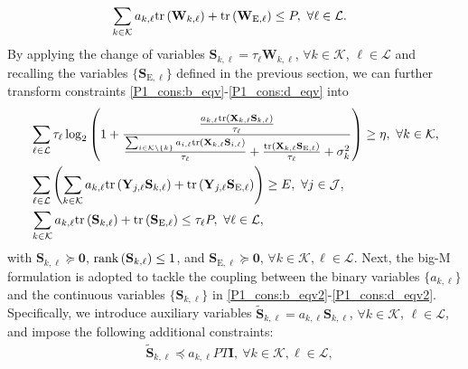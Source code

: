 \documentclass[12pt,draftclsnofoot, onecolumn]{IEEEtran}
\theoremstyle{plain}
\begin{document}
\begin{sloppypar}
{\begin{align}
&  \sum_{k\in\mathcal K}a_{k,\ell}{\rm tr}\left( \mathbf W_{k,\ell}\right)  + {\rm tr}\left(\mathbf W_{\mathrm E,\ell} \right) \leq P, \ \forall \ell\in\mathcal L. \label{P1_cons:d_eqv}
\end{align}}%
By applying the change of variables $\mathbf S_{k,\ell} = \tau_\ell\mathbf W_{k,\ell}$, $\forall k\in\mathcal K$, $\ell\in\mathcal L$ and recalling the variables $\{\mathbf S_{\mathrm E, \ell}\}$ defined in the previous section, we can further transform constraints \eqref{P1_cons:b_eqv}-\eqref{P1_cons:d_eqv} into 
{\setlength\abovedisplayskip{7pt}
\setlength\belowdisplayskip{6pt}  
\begin{align}
& \sum_{\ell\in\mathcal L}\tau_\ell\log_2\left(1 + \frac{\frac{a_{k,\ell}{\rm tr}\left(\mathbf X_{k,\ell}\mathbf S_{k,\ell}\right)}{\tau_\ell}}{\frac{\sum_{i\in \mathcal K\backslash\{k\}}a_{i,\ell}{\rm tr}\left(\mathbf X_{k,\ell}\mathbf S_{i,\ell}\right)}{\tau_\ell} + \frac{{\rm tr}\left(\mathbf X_{k,\ell}\mathbf S_{\mathrm E,\ell}\right)}{\tau_\ell} + \sigma_k^2} \right) \geq \eta, \ \forall k\in\mathcal K, \label{P1_cons:b_eqv2}\\ 
& \sum_{\ell\in\mathcal L}\left(\sum_{k\in\mathcal K}a_{k,\ell}{\rm tr}\left(\mathbf Y_{j,\ell}\mathbf S_{k,\ell}\right) + {\rm tr}\left(\mathbf Y_{j,\ell}\mathbf S_{\mathrm E, \ell} \right) \right) \geq E, \ \forall j\in\mathcal J, \label{P1_cons:c_eqv2}\\
&  \sum_{k\in\mathcal K}a_{k,\ell}{\rm tr}\left( \mathbf S_{k,\ell}\right)  + {\rm tr}\left(\mathbf S_{\mathrm E,\ell} \right)  \leq \tau_\ell P, \ \forall \ell\in\mathcal L, \label{P1_cons:d_eqv2}
\end{align}}%
with $\mathbf S_{k,\ell}\succeq \mathbf 0$, ${\rm rank}\left(\mathbf S_{k,\ell}\right) \leq 1$, and $\mathbf S_{\mathrm E, \ell}\succeq \mathbf 0$, $\forall k\in\mathcal K, \ell\in\mathcal L$. Next, the big-M formulation \cite{2016_Kwan_big-M} is adopted to tackle the coupling between the binary variables $\{a_{k,\ell}\}$ and the continuous variables $\{\mathbf S_{k,\ell}\}$ in \eqref{P1_cons:b_eqv2}-\eqref{P1_cons:d_eqv2}. Specifically, we introduce auxiliary variables $\tilde{\mathbf S}_{k,\ell} = a_{k,\ell}\mathbf S_{k,\ell}$, $\forall k\in\mathcal K$, $\ell\in\mathcal L$, and impose the following additional constraints: 
\begin{subequations}\label{big_M_cons}
	\begin{align}
	& \tilde{\mathbf S}_{k,\ell} \preceq a_{k,\ell}PT\mathbf I, \ \forall k\in\mathcal K, \ell \in\mathcal L, \label{big_M_cons:a}\\

\end{align}
\end{subequations}
\end{sloppypar}
\end{document}
